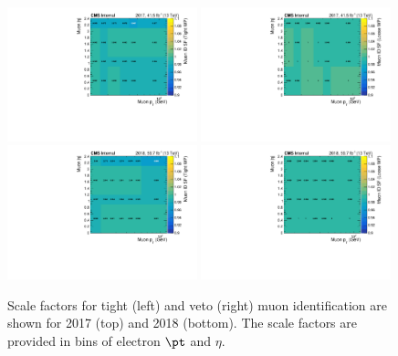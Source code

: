 \begin{figure}[ht!]
  \begin{center}
    \includegraphics[width=0.49\textwidth]{fig/efficiency/lepton/muon_eff_tight_id_2017.pdf}
    \includegraphics[width=0.49\textwidth]{fig/efficiency/lepton/muon_eff_loose_id_2017.pdf}\\
    \includegraphics[width=0.49\textwidth]{fig/efficiency/lepton/muon_eff_tight_id_2018.pdf}
    \includegraphics[width=0.49\textwidth]{fig/efficiency/lepton/muon_eff_loose_id_2018.pdf}
    \caption{
      Scale factors for tight (left) and veto (right) muon identification are shown for 2017 (top) and
      2018 (bottom). The scale factors are provided in bins of electron $\pt$ and $\eta$.
    }
    \label{fig:sf_muon_id}
  \end{center}
\end{figure}


